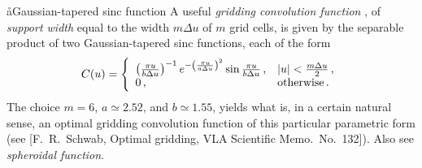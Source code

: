 \aa{Gaussian-tapered sinc function}
A useful {\it gridding convolution function} \qv, of {\it support width}
equal to
the width $m\Delta u$ of $m$ \uv grid cells, is given by the separable product
of two Gaussian-tapered sinc functions, each of the form
\def\ee{{\pi u\over b\Delta u}} \def\ff{{\pi u\over a\Delta u}}
$$C(u)=\left\{ \begin{array}{ll}
  {\left(\ee\right)^{-1}e^{-\left(\ff\right)^2}\sin\ee}\,,&
      |u|<{m\Delta u\over2}\,,\\
   0\,,&\text{otherwise}\,.
  \end{array} \right.
$$
The choice $m=6$, $a\simeq2.52$, and $b\simeq1.55$, yields what is,
in a certain natural sense, an optimal gridding convolution
function of this particular parametric form
(see [F.~R.~Schwab, Optimal gridding, VLA Scientific Memo.\ No.~132]).
Also see {\it spheroidal function}.

